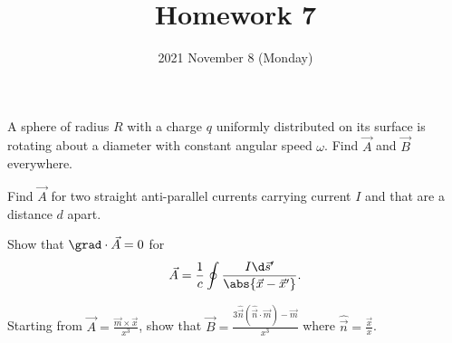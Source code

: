 \documentclass{phys151}
\title{Homework 7}
\date{2021 November 8 (Monday)}
\author{}
\begin{document}
\begin{problem}
  A sphere of radius \(R\) with a charge \(q\) uniformly distributed on its
  surface is rotating about a diameter with constant angular speed \(\omega\).
  Find \(\vec A\) and \(\vec B\) everywhere.
\end{problem}

\begin{solution}

\end{solution}

\begin{problem}
  Find \(\vec A\) for two straight anti-parallel currents carrying current
  \(I\) and that are a distance \(d\) apart.
\end{problem}

\begin{solution}

\end{solution}

\begin{problem}
  Show that \(\grad \cdot \vec A = 0\) for
  \[
    \vec A = \frac 1 c \oint \frac {I \d \vec s'} {\abs {\vec x - \vec x'}}.
  \]
\end{problem}

\begin{solution}

\end{solution}

\begin{problem}
  Starting from \(\vec A = \frac {\vec m \times \vec x} {x^3}\), show that
  \(\vec B = \frac {3 \hat{\vec n} (\hat{\vec n} \cdot \vec m) - \vec m}
  {x^3}\) where \(\hat {\vec n} = \frac {\vec x} x\).
\end{problem}

\begin{solution}

\end{solution}
\end{document}
